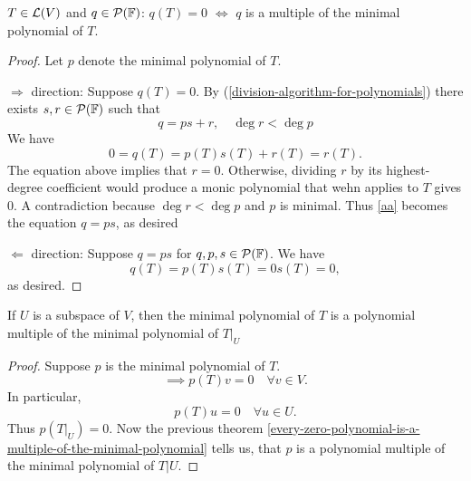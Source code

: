 \setcounter{thm}{28}
\begin{thm}
  \label{every-zero-polynomial-is-a-multiple-of-the-minimal-polynomial}
  $T\in \mathcal{L}(V)$ and $q \in \mathcal{P} (\mathbb{F})$: $q(T)=0$ $\iff$ $q$ is a multiple of the minimal polynomial of $T$.
\end{thm}
\begin{proof}
  Let $p$ denote the minimal polynomial of $T$.

  $\Rightarrow$ direction: Suppose $q(T)=0$.
  By (\ref{division-algorithm-for-polynomials}) there exists $s,r \in \mathcal{P} (\mathbb{F})$ such that
  \begin{equation}
    q=ps+r, \quad \deg r < \deg p
  \end{equation}
  We have
  \begin{equation}
    \label{aa}
    0 = q(T) = p(T)s(T) + r(T) = r(T).
  \end{equation}
  The equation above implies that $r=0$. Otherwise, dividing $r$ by its highest-degree coefficient would produce a monic polynomial that wehn applies to $T$ gives $0$. A contradiction because $\deg r < \deg p$ and $p$ is minimal. Thus \ref{aa} becomes the equation $q=ps$, as desired

  $\Leftarrow$ direction: Suppose $q=ps$ for $q,p,s \in \mathcal{P}(\mathbb{F})$. We have
  \begin{equation}
    q(T) = p(T)s(T)=0s(T)=0,
  \end{equation}
  as desired.
\end{proof}

\setcounter{thm}{30}
\begin{thm}
  \label{minimal-polynomial-of-a-restriction-operator}
  If $U$ is a subspace of $V$, then the minimal polynomial of $T$ is a polynomial multiple of the minimal polynomial of $\left .T \right | _{ U}$
\end{thm}
\begin{proof}
  Suppose $p$ is the minimal polynomial of $T$.
  \begin{equation}
    \implies p(T)v=0 \quad \forall v \in V.
  \end{equation}
  In particular,
  \begin{equation}
    p(T)u=0 \quad \forall u\in U.
  \end{equation} Thus $p\left( \left.T\right|_{U} \right)=0.$ Now the previous theorem
  \ref{every-zero-polynomial-is-a-multiple-of-the-minimal-polynomial} tells us, that $p$ is a polynomial multiple of the minimal polynomial of $\left. T \right | U$.
\end{proof}

